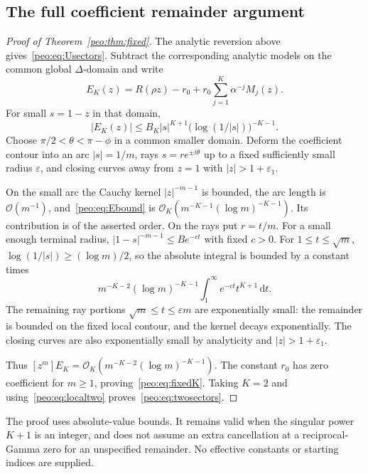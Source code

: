 \documentclass[11pt]{article}
\numberwithin{equation}{section}
\theoremstyle{remark}\newtheorem{remark}[theorem]{Remark}
\newcommand{\dd}{\,\mathrm d}
\newcommand{\Oh}{\mathcal O}
\begin{document}
\subsection{The full coefficient remainder argument}
\begin{proof}[Proof of Theorem~\ref{peo:thm:fixed}]
The analytic reversion above gives~\eqref{peo:eq:Usectors}. Subtract the corresponding analytic models on the common global $\Delta$-domain and write
\begin{equation}
 E_K(z)=R(\rho z)-r_0+r_0\sum_{j=1}^K\alpha^{-j}M_j(z).
\end{equation}
For small $s=1-z$ in that domain,
\begin{equation}
 |E_K(z)|\le B_K|s|^{K+1}\bigl(\log(1/|s|)\bigr)^{-K-1}.
 \label{peo:eq:Ebound}
\end{equation}
Choose $\pi/2<\theta<\pi-\phi$ in a common smaller domain. Deform the coefficient contour into an arc $|s|=1/m$, rays $s=re^{\pm i\theta}$ up to a fixed sufficiently small radius $\varepsilon$, and closing curves away from $z=1$ with $|z|>1+\varepsilon_1$.

On the small arc the Cauchy kernel $|z|^{-m-1}$ is bounded, the arc length is $\Oh(m^{-1})$, and~\eqref{peo:eq:Ebound} is $\Oh_K(m^{-K-1}(\log m)^{-K-1})$. Its contribution is of the asserted order. On the rays put $r=t/m$. For a small enough terminal radius,
$|1-s|^{-m-1}\le B e^{-ct}$ with fixed $c>0$. For $1\le t\le\sqrt m$, $\log(1/|s|)\ge(\log m)/2$, so the absolute integral is bounded by a constant times
\begin{equation}
 m^{-K-2}(\log m)^{-K-1}
 \int_1^\infty e^{-ct}t^{K+1}\dd t.
\end{equation}
The remaining ray portions $\sqrt m\le t\le\varepsilon m$ are exponentially small: the remainder is bounded on the fixed local contour, and the kernel decays exponentially. The closing curves are also exponentially small by analyticity and $|z|>1+\varepsilon_1$.

Thus $[z^m]E_K=\Oh_K(m^{-K-2}(\log m)^{-K-1})$. The constant $r_0$ has zero coefficient for $m\ge1$, proving~\eqref{peo:eq:fixedK}. Taking $K=2$ and using~\eqref{peo:eq:localtwo} proves~\eqref{peo:eq:twosectors}.
\end{proof}
The proof uses absolute-value bounds. It remains valid when the singular power $K+1$ is an integer, and does not assume an extra cancellation at a reciprocal-Gamma zero for an unspecified remainder. No effective constants or starting indices are supplied.
\end{document}
